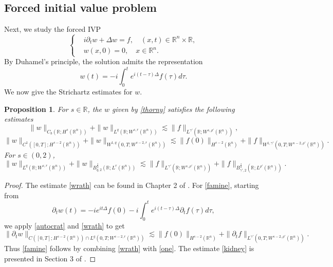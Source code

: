 \documentclass[preprint,compress,12pt]{elsarticle}
\newtheorem{proposition}[theorem]{Proposition}
\numberwithin{equation}{section}
\begin{document}
\subsection{Forced initial value problem}\label{sec22}
Next, we study the forced IVP
\begin{equation}\label{inh}
	\left\{\begin{aligned}
		&i\partial_{t}w+\Delta w=f, \quad (x,t)\in \mathbb{R}^{n} \times \mathbb{R} ,\\
		&w(x,0)=0,\quad x\in \mathbb{R}^{n}.
	\end{aligned}\right.
\end{equation}
By Duhamel's principle, the solution admits the representation
\begin{equation}\label{thorny}
	w(t)=-i\int_{0}^{t}e^{i(t-\tau)\Delta}f(\tau)d\tau.
\end{equation}
We now give the Strichartz estimates for $w$.
\begin{proposition}\label{fuss}
	For $s\in\mathbb{R}$, the $w$ given by \eqref{thorny} satisfies
	the following estimates
	\begin{equation}\label{wrath}
		\|w\|_{C_{b}(\mathbb{R}; H^{s}(\mathbb{R}^{n}))}+\|w\|_{L^{q}(\mathbb{R}; W^{s,r}(\mathbb{R}^{n}))}\lesssim \|f\|_{L^{\gamma'}(\mathbb{R}; W^{s,\rho'}(\mathbb{R}^{n}))},
	\end{equation}
	\begin{equation}\label{famine} \|w\|_{C^{1}([0,T]; H^{s-2}(\mathbb{R}^{n}))}+\|w\|_{W^{1,q}(0,T;W^{s-2,r}(\mathbb{R}^{n}))}\lesssim \|f(0)\|_{H^{s-2}(\mathbb{R}^{n})}+\|f\|_{W^{1,\gamma'}(0,T;W^{s-2,\rho'}(\mathbb{R}^{n}))}.
	\end{equation}
	For $s\in (0,2)$,
	\begin{equation}\label{kidney}
		\|w\|_{L^{q}(\mathbb{R};W^{s,r}(\mathbb{R}^{n}))} +\|w\|_{B^{\frac{s}{2}}_{q,2} (\mathbb{R}; L^{r} (\mathbb{R}^{n}))}\lesssim \|f\|_{L^{\gamma'} (\mathbb{R};  W^{s,\rho'}(\mathbb{R}^{n}))}+\|f\|_{B^{\frac{s}{2}}_{\gamma',2} (\mathbb{R}; L^{\rho'} (\mathbb{R}^{n}))}.
	\end{equation}
\end{proposition}
\begin{proof}
	The estimate \eqref{wrath} can be found in Chapter 2 of \cite{facetious}. For \eqref{famine}, starting from $$\partial_{t}w(t)=-ie^{it\Delta}f(0)-i\int_{0}^{t}e^{i(t-\tau)\Delta}\partial_{t}f(\tau)d\tau,$$ we apply \eqref{autocrat} and \eqref{wrath} to get
	\begin{equation} \label{one}
		\|\partial_{t}w\|_{C([0,T]; H^{s-2}(\mathbb{R}^{n}))\cap L^{q}(0,T;W^{s-2,r}(\mathbb{R}^{n}))}\lesssim \|f(0)\|_{H^{s-2}(\mathbb{R}^{n})}+  \|\partial_{t}f\|_{L^{\gamma'}(0,T;W^{s-2,\rho'}(\mathbb{R}^{n}))}.
	\end{equation}
	Thus \eqref{famine} follows by combining \eqref{wrath} with \eqref{one}. The estimate \eqref{kidney} is presented in Section 3 of \cite{facilitate}.
\end{proof}	
\end{document}
